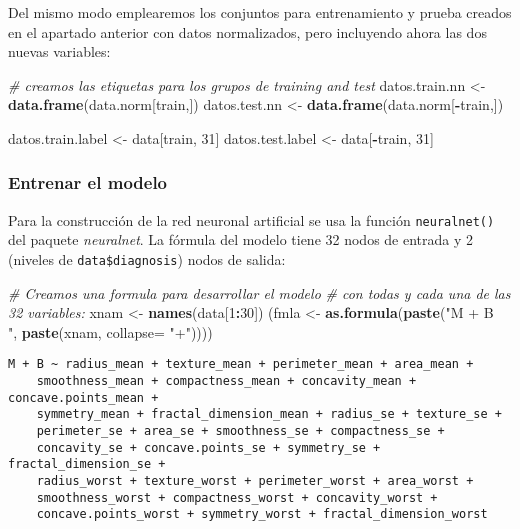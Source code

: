 \documentclass[
]{article}
\newenvironment{Shaded}{\begin{snugshade}}{\end{snugshade}}
\newcommand{\CommentTok}[1]{\textcolor[rgb]{0.56,0.35,0.01}{\textit{#1}}}
\newcommand{\DataTypeTok}[1]{\textcolor[rgb]{0.13,0.29,0.53}{#1}}
\newcommand{\DecValTok}[1]{\textcolor[rgb]{0.00,0.00,0.81}{#1}}
\newcommand{\KeywordTok}[1]{\textcolor[rgb]{0.13,0.29,0.53}{\textbf{#1}}}
\newcommand{\NormalTok}[1]{#1}
\newcommand{\OperatorTok}[1]{\textcolor[rgb]{0.81,0.36,0.00}{\textbf{#1}}}
\newcommand{\StringTok}[1]{\textcolor[rgb]{0.31,0.60,0.02}{#1}}
\begin{document}
Del mismo modo emplearemos los conjuntos para entrenamiento y prueba
creados en el apartado anterior con datos normalizados, pero incluyendo
ahora las dos nuevas variables:

\begin{Shaded}
\begin{Highlighting}[]
\CommentTok{# creamos las etiquetas para los grupos de training and test}
\NormalTok{datos.train.nn <-}\StringTok{ }\KeywordTok{data.frame}\NormalTok{(data.norm[train,])}
\NormalTok{datos.test.nn  <-}\StringTok{ }\KeywordTok{data.frame}\NormalTok{(data.norm[}\OperatorTok{-}\NormalTok{train,])}

\NormalTok{datos.train.label <-}\StringTok{ }\NormalTok{data[train, }\DecValTok{31}\NormalTok{]}
\NormalTok{datos.test.label <-}\StringTok{ }\NormalTok{data[}\OperatorTok{-}\NormalTok{train, }\DecValTok{31}\NormalTok{]}
\end{Highlighting}
\end{Shaded}

\hypertarget{entrenar-el-modelo-2}{%
\subsubsection{Entrenar el modelo}\label{entrenar-el-modelo-2}}

Para la construcción de la red neuronal artificial se usa la función
\texttt{neuralnet()} del paquete \emph{neuralnet}. La fórmula del modelo
tiene 32 nodos de entrada y 2 (niveles de \texttt{data\$diagnosis})
nodos de salida:

\begin{Shaded}
\begin{Highlighting}[]
\CommentTok{# Creamos una formula para desarrollar el modelo }
\CommentTok{# con todas y cada una de las 32 variables:}
\NormalTok{xnam <-}\StringTok{ }\KeywordTok{names}\NormalTok{(data[}\DecValTok{1}\OperatorTok{:}\DecValTok{30}\NormalTok{])}
\NormalTok{(fmla <-}\StringTok{ }\KeywordTok{as.formula}\NormalTok{(}\KeywordTok{paste}\NormalTok{(}\StringTok{"M + B ~ "}\NormalTok{, }\KeywordTok{paste}\NormalTok{(xnam, }\DataTypeTok{collapse=} \StringTok{"+"}\NormalTok{))))}
\end{Highlighting}
\end{Shaded}

\begin{verbatim}
M + B ~ radius_mean + texture_mean + perimeter_mean + area_mean + 
    smoothness_mean + compactness_mean + concavity_mean + concave.points_mean + 
    symmetry_mean + fractal_dimension_mean + radius_se + texture_se + 
    perimeter_se + area_se + smoothness_se + compactness_se + 
    concavity_se + concave.points_se + symmetry_se + fractal_dimension_se + 
    radius_worst + texture_worst + perimeter_worst + area_worst + 
    smoothness_worst + compactness_worst + concavity_worst + 
    concave.points_worst + symmetry_worst + fractal_dimension_worst
\end{verbatim}
\end{document}
